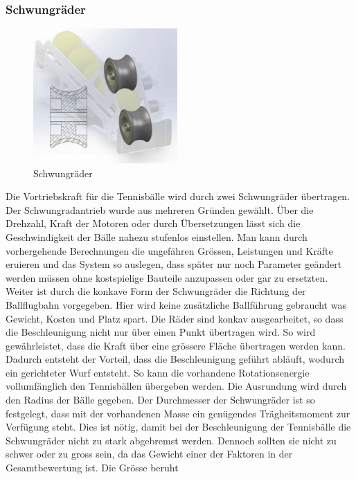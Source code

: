\subsubsection{Schwungräder}
\begin{figure}
	\includegraphics[width=0.49\textwidth]{Enddokumentation/Loesungskonzept/Bilder/Schwungraeder.jpg}
	\caption{Schwungräder}
	\label{fig:Schwungräder}	
\end{figure}
Die Vortriebskraft für die Tennisbälle wird durch zwei Schwungräder übertragen. Der
Schwungradantrieb wurde aus mehreren Gründen gewählt. Über die Drehzahl, Kraft der Motoren oder
durch Übersetzungen lässt sich die Geschwindigkeit der Bälle nahezu stufenlos einstellen. Man kann
durch vorhergehende Berechnungen die ungefähren Grössen, Leistungen und Kräfte eruieren und das
System so auslegen, dass später nur noch Parameter geändert werden müssen ohne kostspielige Bauteile
anzupassen oder gar zu ersetzten. Weiter ist durch die konkave Form der Schwungräder die Richtung der 
Ballflugbahn vorgegeben. Hier wird keine zusätzliche Ballführung gebraucht was Gewicht, Kosten und
Platz spart. Die Räder sind konkav ausgearbeitet, so dass die Beschleunigung nicht nur über einen
Punkt übertragen wird. So wird gewährleistet, dass die Kraft über eine grössere Fläche
übertragen werden kann. Dadurch entsteht der Vorteil, dass die Beschleunigung geführt
abläuft, wodurch ein gerichteter Wurf entsteht. So kann die vorhandene Rotationsenergie vollumfänglich 
den Tennisbällen übergeben werden. Die Ausrundung wird durch den Radius der Bälle
gegeben. Der Durchmesser der Schwungräder ist so festgelegt, dass mit der vorhandenen Masse ein
genügendes Trägheitsmoment zur Verfügung steht. Dies ist nötig, damit bei der Beschleunigung der
Tennisbälle die Schwungräder nicht zu stark abgebremst werden. Dennoch sollten sie nicht zu schwer
oder zu gross sein, da das Gewicht einer der Faktoren in der Gesamtbewertung ist. Die Grösse beruht
